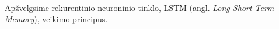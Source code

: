 Apžvelgsime rekurentinio neuroninio tinklo, LSTM (angl. \textit{Long Short Term Memory}), veikimo principus.
